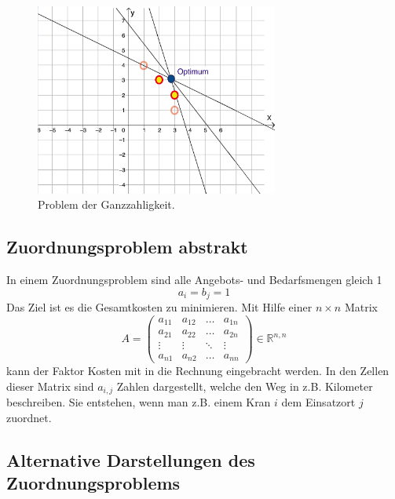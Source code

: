 \begin{figure}
\centering
\includegraphics[width=8cm]{papers/munkres/figures/ganzzahlige_punkte}
\caption{Problem der Ganzzahligkeit.}
\label{munkres:Vr2}
\end{figure}


\subsection{Zuordnungsproblem abstrakt
\label{munkres:subsection:bonorum}}

In einem Zuordnungsproblem sind alle Angebots- und Bedarfsmengen gleich 1 
\begin{equation}
a_{i}=b_{j}=1
\end{equation}
Das Ziel ist es die Gesamtkosten zu minimieren. Mit Hilfe einer $n\times n$ Matrix 
\[
A
=
\begin{pmatrix}
a_{11}&a_{12}&\dots &a_{1n}\\
a_{21}&a_{22}&\dots &a_{2n}\\
\vdots&\vdots&\ddots&\vdots\\
a_{n1}&a_{n2}&\dots &a_{nn}
\end{pmatrix}
\in \mathbb{R}^{n,n}
\]
kann der Faktor Kosten mit in die Rechnung eingebracht werden.
In den Zellen dieser Matrix sind $a_{i,j}$ Zahlen dargestellt, welche den Weg in z.B. Kilometer beschreiben.
Sie entstehen, wenn man z.B. einem Kran $i$ dem Einsatzort $j$ zuordnet.

\subsection{Alternative Darstellungen des Zuordnungsproblems
\label{munkres:subsection:bonorum}}
